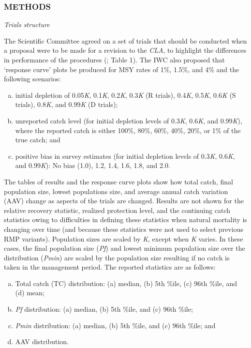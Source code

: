 \documentclass[]{article}
\begin{document}
\subsubsection{METHODS}\label{methods}

\emph{Trials structure}

The Scientific Committee agreed on a set of trials that should be
conducted when a proposal were to be made for a revision to the
\emph{CLA}, to highlight the differences in performance of the
procedures (\autocite{iwc_2007}; Table 1). The IWC \autocite{iwc_2007} also proposed
that `response curve' plots be produced for MSY rates of 1\%, 1.5\%, and
4\% and the following scenarios:

\begin{enumerate}[a.]
\itemsep1pt\parskip0pt
\item
  initial depletion of 0.05\emph{K}, 0.1\emph{K}, 0.2\emph{K},
  0.3\emph{K} (R trials), 0.4\emph{K}, 0.5\emph{K}, 0.6\emph{K} (S
  trials), 0.8\emph{K}, and 0.99\emph{K} (D trials);
\item
  unreported catch level (for initial depletion levels of 0.3\emph{K},
  0.6\emph{K}, and 0.99\emph{K}), where the reported catch is either
  100\%, 80\%, 60\%, 40\%, 20\%, or 1\% of the true catch; and
\item
  positive bias in survey estimates (for initial depletion levels of
  0.3\emph{K}, 0.6\emph{K}, and 0.99\emph{K}): No bias (1.0), 1.2, 1.4,
  1.6, 1.8, and 2.0.
\end{enumerate}

The tables of results and the response curve plots show how total catch,
final population size, lowest populations size,
and average annual catch variation (AAV) change as aspects of the trials are changed.
Results are not shown for the relative recovery statistic, realized protection level,
and the continuing catch statistics owing to difficulties in defining these
statistics when natural mortality is changing over time
(and because these statistics were not used to select previous RMP variants).
Population sizes are scaled by \emph{K}, except when \emph{K} varies.
In these cases, the final population size (\emph{Pf}) and lowest
minimum population size over the distribution (\emph{Pmin}) are scaled by
the population size resulting if no catch is taken in the management period.
The reported statistics are as follows:

\begin{enumerate}[a.]
\itemsep1pt\parskip0pt
\item
  Total catch (TC) distribution: (a) median, (b) 5th \%ile, (c) 96th
  \%ile, and (d) mean;
\item
  \emph{Pf} distribution: (a) median, (b) 5th \%ile, and (c) 96th \%ile;
\item
  \emph{Pmin} distribution: (a) median, (b) 5th \%ile, and (c) 96th
  \%ile; and
\item
  AAV distribution.
\end{enumerate}
\end{document}
